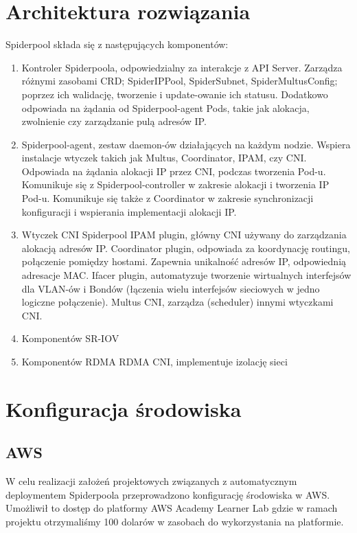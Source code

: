 \documentclass[onecolumn,12pt]{article}
\begin{document}
\section{Architektura rozwiązania}
Spiderpool składa się z następujących komponentów:
\begin{enumerate}
    \item Kontroler Spiderpoola, odpowiedzialny za interakcje z API Server. 
    Zarządza różnymi zasobami CRD; SpiderIPPool, SpiderSubnet, SpiderMultusConfig; poprzez ich walidację, tworzenie i update-owanie ich statusu. 
    Dodatkowo odpowiada na żądania od Spiderpool-agent Pods, takie jak alokacja, zwolnienie czy zarządzanie pulą adresów IP. 
    \item Spiderpool-agent, zestaw daemon-ów działających na każdym nodzie. 
    Wspiera instalacje wtyczek takich jak Multus, Coordinator, IPAM, czy CNI. 
    Odpowiada na żądania alokacji IP przez CNI, podczas tworzenia Pod-u. 
    Komunikuje się z Spiderpool-controller w zakresie alokacji i tworzenia IP Pod-u. 
    Komunikuje się także z Coordinator w zakresie synchronizacji konfiguracji i wspierania implementacji alokacji IP.
    \item Wtyczek CNI
    \newline Spiderpool IPAM plugin, główny CNI używany do zarządzania alokacją adresów IP.
    \newline Coordinator plugin, odpowiada za koordynację routingu, połączenie pomiędzy hostami. 
    Zapewnia unikalność adresów IP, odpowiednią adresacje MAC.
    \newline Ifacer plugin, automatyzuje tworzenie wirtualnych interfejsów dla VLAN-ów i Bondów (łączenia wielu interfejsów sieciowych w jedno logiczne połączenie).
    \newline Multus CNI, zarządza (scheduler) innymi wtyczkami CNI.
    \item Komponentów SR-IOV
    \item Komponentów RDMA
    \newline RDMA CNI, implementuje izolację sieci
\end{enumerate}

\newpage

\section{Konfiguracja środowiska}

\subsection{AWS}
W celu realizacji założeń projektowych związanych z automatycznym deploymentem Spiderpoola 
przeprowadzono konfigurację środowiska w AWS. Umożliwił to dostęp do platformy AWS Academy Learner
Lab gdzie w ramach projektu otrzymaliśmy 100 dolarów w zasobach do wykorzystania na platformie. 
\end{document}
